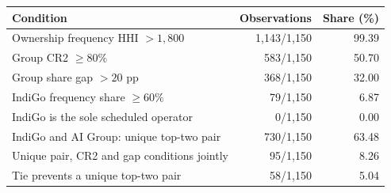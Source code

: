 \begin{tabular}{@{}lrr@{}}
\toprule
Condition & Observations & Share (\%) \\
\midrule
Ownership frequency HHI $>1{,}800$ & 1,143/1,150 & 99.39 \\
Group CR2 $\geq80\%$ & 583/1,150 & 50.70 \\
Group share gap $>20$ pp & 368/1,150 & 32.00 \\
IndiGo frequency share $\geq60\%$ & 79/1,150 & 6.87 \\
IndiGo is the sole scheduled operator & 0/1,150 & 0.00 \\
IndiGo and AI Group: unique top-two pair & 730/1,150 & 63.48 \\
Unique pair, CR2 and gap conditions jointly & 95/1,150 & 8.26 \\
Tie prevents a unique top-two pair & 58/1,150 & 5.04 \\
\bottomrule
\end{tabular}
